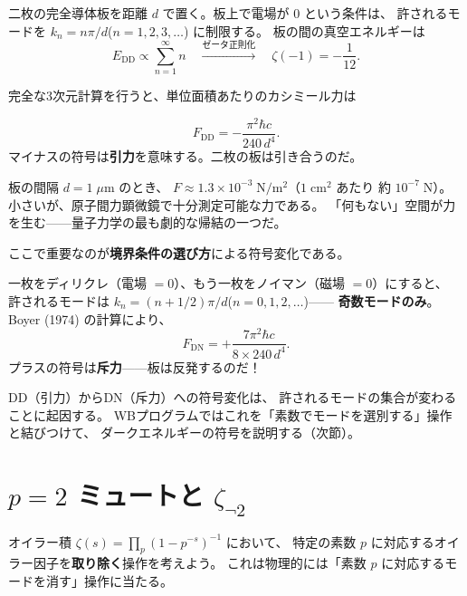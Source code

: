 \begin{dfnbox}
二枚の完全導体板を距離 $d$ で置く。板上で電場が $0$ という条件は、
許されるモードを $k_n = n\pi/d$\;($n = 1, 2, 3, \ldots$) に制限する。
板の間の真空エネルギーは
\[
  E_{\mathrm{DD}} \propto \sum_{n=1}^{\infty} n
  \quad\xrightarrow{\text{ゼータ正則化}}\quad
  \zeta(-1) = -\frac{1}{12}.
\]
\end{dfnbox}

完全な3次元計算を行うと、単位面積あたりのカシミール力は

\begin{keybox}
\[
  F_{\mathrm{DD}} = -\frac{\pi^2\hbar c}{240\, d^4}.
\]
マイナスの符号は\textbf{引力}を意味する。二枚の板は引き合うのだ。
\end{keybox}

\begin{hsbox}
板の間隔 $d = 1\;\mu\mathrm{m}$ のとき、
$F \approx 1.3 \times 10^{-3}\;\mathrm{N/m^2}$（$1\;\mathrm{cm^2}$ あたり
約 $10^{-7}\;\mathrm{N}$）。
小さいが、原子間力顕微鏡で十分測定可能な力である。
「何もない」空間が力を生む——量子力学の最も劇的な帰結の一つだ。
\end{hsbox}

ここで重要なのが\textbf{境界条件の選び方}による符号変化である。

\begin{keybox}
一枚をディリクレ（電場 $=0$）、もう一枚をノイマン（磁場 $=0$）にすると、
許されるモードは $k_n = (n+1/2)\pi/d$\;($n = 0, 1, 2, \ldots$)——
\textbf{奇数モードのみ}。Boyer (1974) の計算により、
\[
  F_{\mathrm{DN}} = +\frac{7\pi^2\hbar c}{8 \times 240\, d^4}.
\]
プラスの符号は\textbf{斥力}——板は反発するのだ！
\end{keybox}

DD（引力）からDN（斥力）への符号変化は、
許されるモードの集合が変わることに起因する。
WBプログラムではこれを「素数でモードを選別する」操作と結びつけて、
ダークエネルギーの符号を説明する（次節）。

\section{$p=2$ ミュートと $\zeta_{\neg 2}$}
\label{sec:4.3}

オイラー積 $\zeta(s) = \prod_p(1-p^{-s})^{-1}$ において、
特定の素数 $p$ に対応するオイラー因子を\textbf{取り除く}操作を考えよう。
これは物理的には「素数 $p$ に対応するモードを消す」操作に当たる。

